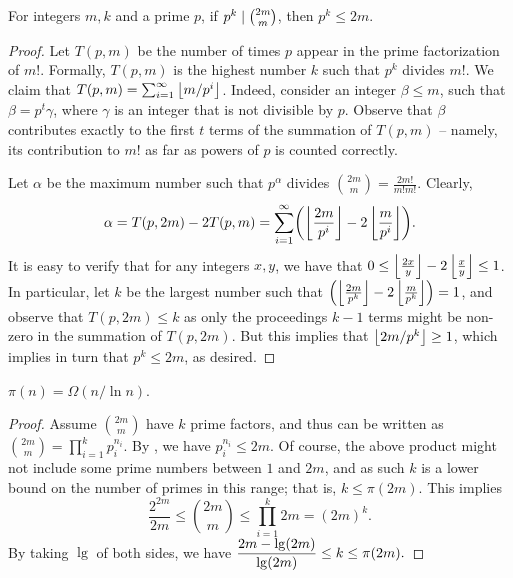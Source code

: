 \begin{lemma}
    For integers $m, k$ and a prime $p$, if $p^k \mid
    \binom{2m}{m}$, then $p^k \leq 2m$.
\end{lemma}
\begin{proof}
    Let $T(p,m)$ be the number of times $p$ appear in the prime
    factorization of $m!$. Formally, $T(p,m)$ is the highest number
    $k$ such that $p^k$ divides $m!$. We claim that $T(p,m) =
    \sum_{i=1}^{\infty} \left\lfloor {m / p^i} \right\rfloor$. Indeed, consider an integer
    $\beta \leq m$, such that $\beta = p^t \gamma $, where $\gamma$ is
    an integer that is not divisible by $p$. Observe that $\beta$
    contributes exactly to the first $t$ terms of the summation of
    $T(p,m)$ -- namely, its contribution to $m!$ as far as powers of
    $p$ is counted correctly.

    Let $\alpha$ be the maximum number such that $p^\alpha$ divides
    $\binom{2m}{m} = \frac{2m!}{m! m!}$. Clearly, 
    \begin{align*}
        \alpha%
        =%
        T(p,2m) - 2T(p,m)%
        =%
        \sum_{i=1}^\infty \pth{ \floor{\frac{2m}{ p^i}} -2
           \floor{\frac{m}{p^i}}}.
    \end{align*}
    It is easy to verify that for any integers $x, y$, we have that $0
    \leq \left\lfloor {\frac{2x}{y}} \right\rfloor - 2 \left\lfloor {\frac{x}{y}} \right\rfloor \leq 1$. In
    particular, let $k$ be the largest number such that\newline
    $\pth[]{ \floor{\frac{2m}{ p^k}} -2 \floor{\frac{m}{p^k}}} =1$, and
    observe that $T(p, 2m) \leq k$ as only the proceedings $k-1$ terms
    might be non-zero in the summation of $T(p,2m)$. But this implies
    that $\left\lfloor {2m/p^k} \right\rfloor\geq 1$, which implies in turn that $p^k \leq
    2m$, as desired.
\end{proof}

\begin{lemma}
    $\pi(n) = \Omega(n /\ln n)$.
\end{lemma}
\begin{proof}
    Assume $\binom{2m}{m}$ have $k$ prime factors, and thus can be
    written as
    \begin{math}
        \binom{2m}{m} = \prod_{i=1}^k{p_i^{n_i}}.
    \end{math}
    By , we have $p_i^{n_i} \le 2m$. Of
    course, the above product might not include some prime numbers
    between $1$ and $2m$, and as such $k$ is a lower bound on the
    number of primes in this range; that is, $k \leq \pi(2m)$.  This
    implies
    \begin{equation*}
        \frac{2^{2m}}{2m} \le \binom{2m}{m} \le 
        \prod_{i=1}^k{2m} = (2m)^k.
    \end{equation*}
    By taking $\lg$ of both sides, we have
    \begin{math}
        \displaystyle \frac{2m - \lg(2m)}{\lg(2m)} \leq k \leq \pi(2m).
    \end{math}
\end{proof}

